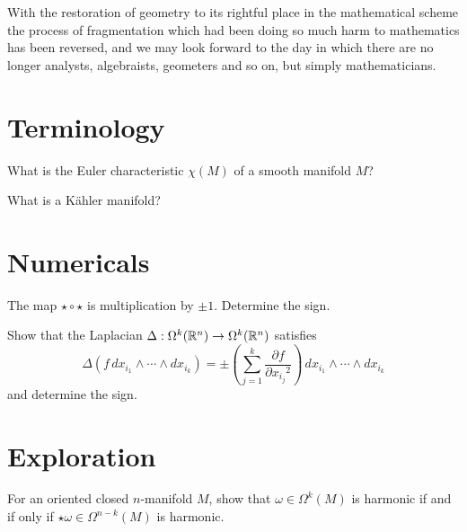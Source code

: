 \documentclass{homework}
\author{Jim Fowler}
\begin{document}
\maketitle

\begin{inspiration}
 With the restoration of geometry to its rightful place in the mathematical scheme the process of fragmentation which had been doing so much harm to mathematics has been reversed, and we may look forward to the day in which there are no longer analysts, algebraists, geometers and so on, but simply mathematicians.
\end{inspiration}

\section{Terminology}

\begin{problem}
 What is the Euler characteristic $\chi(M)$ of a smooth manifold $M$? 
\end{problem}

\begin{problem}
What is a K\"ahler manifold?
\end{problem}

\section{Numericals}

\begin{problem} The map $\star \circ \star$ is multiplication by $\pm
1$.  Determine the sign.
\end{problem}

\begin{problem}
  Show that the Laplacian $\Delta : \Omega^k(\mathbb{R}^n) \to \Omega^k(\mathbb{R}^n)$  satisfies
  \[
    \Delta \left( f \, dx_{i_1} \wedge \cdots \wedge dx_{i_k} \right) = \pm \left( \sum_{j=1}^k \frac{\partial f}{\partial {x_{i_j}}^2} \right) \, dx_{i_1} \wedge \cdots \wedge dx_{i_k}
  \]
and determine the sign.
\end{problem}

\section{Exploration}

\begin{problem} For an oriented closed $n$-manifold $M$, show that
$\omega \in \Omega^k(M)$ is harmonic if and if only if $\star \omega
\in \Omega^{n-k}(M)$ is harmonic.
\end{problem}
\end{document}
